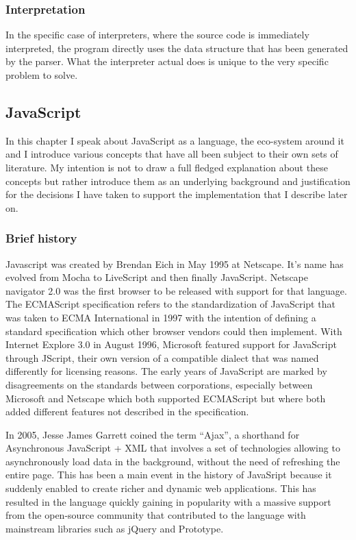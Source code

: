 
\subsubsection{Interpretation}

In the specific case of interpreters, where the source code is immediately interpreted, the program directly uses the data structure that has been generated by the parser. What the interpreter actual does is unique to the very specific problem to solve.

\subsection{JavaScript}

In this chapter I speak about JavaScript as a language, the eco-system around it and I introduce various concepts that have all been subject to their own sets of literature. My intention is not to draw a full fledged explanation about these concepts but rather introduce them as an underlying background and justification for the decisions I have taken to support the implementation that I describe later on.

\subsubsection{Brief history}

Javascript was created by Brendan Eich in May 1995 at Netscape. It's name has evolved from Mocha to LiveScript and then finally JavaScript. Netscape navigator 2.0 was the first browser to be released with support for that language. The ECMAScript specification refers to the standardization of JavaScript that was taken to ECMA International in 1997 with the intention of defining a standard specification which other browser vendors could then implement. With Internet Explore 3.0 in August 1996, Microsoft featured support for JavaScript through JScript, their own version of a compatible dialect that was named differently for licensing reasons. The early years of JavaScript are marked by disagreements on the standards between corporations, especially between Microsoft and Netscape which both supported ECMAScript but where both added different features not described in the specification.

In 2005, Jesse James Garrett coined the term ``Ajax''\cite{Garrett2005}, a shorthand for Asynchronous JavaScript + XML that involves a set of technologies allowing to asynchronously load data in the background, without the need of refreshing the entire page. This has been a main event in the history of JavaSript because it suddenly enabled to create richer and dynamic web applications. This has resulted in the language quickly gaining in popularity with a massive support from the open-source community that contributed to the language with mainstream libraries such as jQuery and Prototype.

